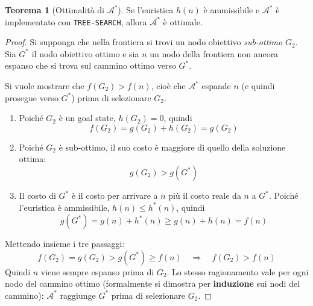 \documentclass[a4paper, 11pt, oneside]{book}
\theoremstyle{definition}
\newtheorem{theorem}{Teorema}[section]
\begin{document}
	\begin{theorem}[Ottimalit\`a di $\mathcal{A}^*$]
		Se l'euristica $h(n)$ \`e ammissibile e $\mathcal{A}^*$ \`e implementato con
		\texttt{TREE-SEARCH}, allora $\mathcal{A}^*$ \`e ottimale.
	\end{theorem}

	\begin{proof}
		Si supponga che nella frontiera si trovi un nodo obiettivo \emph{sub-ottimo} $G_2$.
		Sia $G^*$ il nodo obiettivo ottimo e sia $n$ un nodo della frontiera non ancora
		espanso che si trova sul cammino ottimo verso $G^*$.

		\begin{center}
		\end{center}

		Si vuole mostrare che $f(G_2) > f(n)$, cio\`e che $\mathcal{A}^*$ espande $n$ (e
		quindi prosegue verso $G^*$) prima di selezionare $G_2$.
		\begin{enumerate}
			\item Poich\'e $G_2$ \`e un goal state, $h(G_2) = 0$, quindi
				\[
					f(G_2) = g(G_2) + h(G_2) = g(G_2)
				\]

			\item Poich\'e $G_2$ \`e sub-ottimo, il suo costo \`e maggiore di quello della
				soluzione ottima:
				\[
					g(G_2) > g(G^*)
				\]

			\item Il costo di $G^*$ \`e il costo per arrivare a $n$ pi\`u il costo reale da
				$n$ a $G^*$. Poich\'e l'euristica \`e ammissibile, $h(n) \leq h^*(n)$, quindi
				\[
					g(G^*) = g(n) + h^*(n) \geq g(n) + h(n) = f(n)
				\]
		\end{enumerate}
		Mettendo insieme i tre passaggi:
		\[
			f(G_2) = g(G_2) > g(G^*) \geq f(n) \quad\Longrightarrow\quad f(G_2) > f(n)
		\]
		Quindi $n$ viene sempre espanso prima di $G_2$. Lo stesso ragionamento vale per ogni
		nodo del cammino ottimo (formalmente si dimostra per \textbf{induzione} sui nodi del
		cammino): $\mathcal{A}^*$ raggiunge $G^*$ prima di selezionare $G_2$.
	\end{proof}
\end{document}
